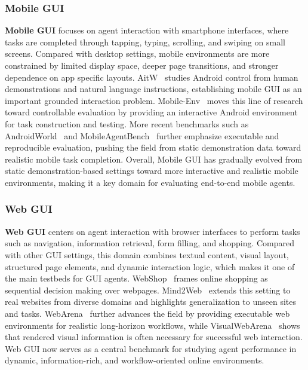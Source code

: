\subsubsection{Mobile GUI}
\label{Mobile  GUI}
\textbf{Mobile GUI} focuses on agent interaction with smartphone interfaces, where tasks are completed through tapping, typing, scrolling, and swiping on small screens. Compared with desktop settings, mobile environments are more constrained by limited display space, deeper page transitions, and stronger dependence on app specific layouts. AitW~\cite{AitW} studies Android control from human demonstrations and natural language instructions, establishing mobile GUI as an important grounded interaction problem. Mobile-Env~\cite{Mobile-Env} moves this line of research toward controllable evaluation by providing an interactive Android environment for task construction and testing. More recent benchmarks such as AndroidWorld~\cite{AndroidWorld} and MobileAgentBench~\cite{MobileAgentBench} further emphasize executable and reproducible evaluation, pushing the field from static demonstration data toward realistic mobile task completion. Overall, Mobile GUI has gradually evolved from static demonstration-based settings toward more interactive and realistic mobile environments, making it a key domain for evaluating end-to-end mobile agents.

\subsubsection{Web GUI}
\label{Web GUI}
\textbf{Web GUI} centers on agent interaction with browser interfaces to perform tasks such as navigation, information retrieval, form filling, and shopping. Compared with other GUI settings, this domain combines textual content, visual layout, structured page elements, and dynamic interaction logic, which makes it one of the main testbeds for GUI agents. WebShop~\cite{WebShop} frames online shopping as sequential decision making over webpages. Mind2Web~\cite{Mind2Web} extends this setting to real websites from diverse domains and highlights generalization to unseen sites and tasks. WebArena~\cite{WebArena} further advances the field by providing executable web environments for realistic long-horizon workflows, while VisualWebArena~\cite{VisualWebArena} shows that rendered visual information is often necessary for successful web interaction. Web GUI now serves as a central benchmark for studying agent performance in dynamic, information-rich, and workflow-oriented online environments.

